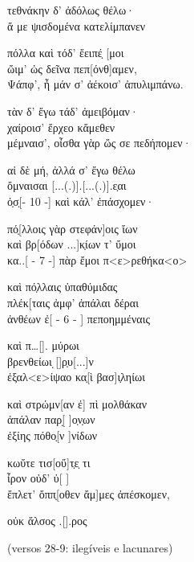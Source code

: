 \begin{gkverse}
τεθνάκην δ’ ἀδόλως θέλω·\\
ἄ με ψισδομένα κατελίμπανεν

πόλλα καὶ τόδ’ ἔειπέ̣  [μοι\\
ὤιμ’ ὠς δεῖνα πεπ[όνθ]αμεν,\\
Ψάπφ’, ἦ μάν σ’ ἀέκοισ’ ἀπυλιμπάνω.

τὰν δ’ ἔγω τάδ’ ἀμειβόμαν·\\
χαίροισ’ ἔρχεο κἄμεθεν\\
μέμναισ’, οἶσθα γὰρ ὤς σε πεδήπομεν·

αἰ δὲ μή, ἀλλά σ’ ἔγω θέλω\\
ὄμναισαι [...(.)].[...(.)].ε̣αι\\
ὀ̣σ̣[\qquad     - 10 -\qquad   ] καὶ κάλ’ ἐπάσχομεν·

πό̣[λλοις γὰρ στεφάν]οις ἴων\\
καὶ βρ[όδων ...]κ̣ίων τ’ ὔμοι\\
κα..[ - 7 -\quad   ] πὰρ ἔμοι π<ε>ρεθήκα<ο>

καὶ πό̣λλαις ὐπαθύμιδας\\
πλέκ[ταις ἀμφ’ ἀπάλαι δέραι\\
ἀνθέων ἐ[  -  6  -  ] πεποημμέναις

καὶ π\ldots{}[\qquad      ]. μύρωι\\
βρενθείωι ̣[\qquad      ]ρ̣υ[...]ν\\
ἐξαλ<ε>ίψαο κα̣[ὶ βασ]ι̣ληίωι

καὶ στρώμν[αν ἐ] πὶ μολθάκαν\\
ἀπάλαν παρ[̣ \quad   ]ο̣ν̣ων\\ 
ἐξίης πόθο̣[ν \quad    ]νίδων

κωὔτε τισ[\quad       οὔ]τ̣ε̣ τι\\
ἶρον οὐδ’ ὐ[ \quad        ]\\
ἔπλετ’ ὄππ̣[οθεν ἄμ]μες ἀπέσκομεν,

οὐκ ἄλσος .[\qquad	       ].ρος

\textnormal{(versos 28-9: ilegíveis e lacunares)}
\end{gkverse}

\pagebreak

